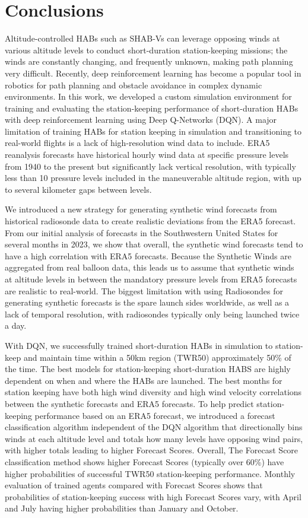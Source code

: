 \section{Conclusions}

Altitude-controlled HABs such as SHAB-Vs can leverage opposing winds at various altitude levels to conduct short-duration station-keeping missions; the winds are constantly changing, and frequently unknown, making path planning very difficult. Recently, deep reinforcement learning has become a popular tool in robotics for path planning and obstacle avoidance in complex dynamic environments.  In this work, we developed a custom simulation environment for training and evaluating the station-keeping performance of short-duration HABs with deep reinforcement learning using Deep Q-Networks (DQN). A major limitation of training HABs for station keeping in simulation and transitioning to real-world flights is a lack of high-resolution wind data to include.  ERA5 reanalysis forecasts have historical hourly wind data at specific pressure levels from 1940 to the present but significantly lack vertical resolution, with typically less than 10 pressure levels included in the maneuverable altitude region, with up to several kilometer gaps between levels.  

We introduced a new strategy for generating synthetic wind forecasts from historical radiosonde data to create realistic deviations from the ERA5 forecast. From our initial analysis of forecasts in the Southwestern United States for several months in 2023, we show that overall, the synthetic wind forecasts tend to have a high correlation with ERA5 forecasts. Because the Synthetic Winds are aggregated from real balloon data, this leads us to assume that synthetic winds at altitude levels in between the mandatory pressure levels from ERA5 forecasts are realistic to real-world.  The biggest limitation with using Radiosondes for generating synthetic forecasts is the spare launch sides worldwide, as well as a lack of temporal resolution, with radiosondes typically only being launched twice a day.  

With DQN, we successfully trained short-duration HABs in simulation to station-keep and maintain time within a 50km region (TWR50) approximately 50\% of the time.  The best models for station-keeping short-duration HABS are highly dependent on when and where the HABs are launched.  The best months for station keeping have both high wind diversity and high wind velocity correlations between the synthetic forecasts and ERA5 forecasts.  To help predict station-keeping performance based on an ERA5 forecast, we introduced a forecast classification algorithm independent of the DQN algorithm that directionally bins winds at each altitude level and totals how many levels have opposing wind pairs, with higher totals leading to higher Forecast Scores.  Overall, The Forecast Score classification method shows higher Forecast Scores (typically over 60\%) have higher probabilities of successful TWR50 station-keeping performance.   Monthly evaluation of trained agents compared with Forecast Scores shows that probabilities of station-keeping success with high Forecast Scores vary, with April and July having higher probabilities than January and October. 

